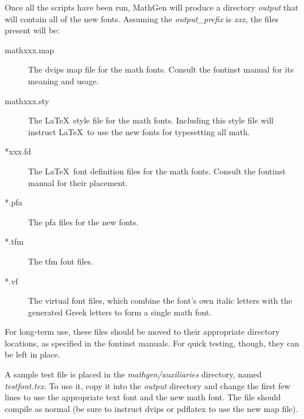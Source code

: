 
Once all the scripts have been run, MathGen will produce a directory
\emph{output} that will contain all of the new fonts. Assuming the
\emph{output\_prefix} is \emph{xxx}, the files present will be:
\begin{description}
\item[mathxxx.map] The \ac{dvips} map file for the math fonts. Consult the
fontinst manual for its meaning and usage.
\item[mathxxx.sty] The \LaTeX\ style file for the math fonts. Including this
style file will instruct \LaTeX\ to use the new fonts for typesetting all math.
\item[*xxx.fd] The \LaTeX\ font definition files for the math fonts. Consult the
fontinst manual for their placement.
\item[*.pfa] The \ac{pfa} files for the new fonts.
\item[*.tfm] The \ac{tfm} font files.
\item[*.vf] The virtual font files, which combine the font's own italic letters
with the generated Greek letters to form a single math font.
\end{description}
For long-term use, these files should be moved to their appropriate directory
locations, as specified in the fontinst manuals. For quick testing, though, they
can be left in place.

A sample test file is placed in the \emph{mathgen/auxiliaries} directory, named
\emph{testfont.tex}. To use it, copy it into the \emph{output} directory and
change the first few lines to use the appropriate text font and the new math
font. The file should compile as normal (be sure to instruct dvips or pdflatex
to use the new map file).
